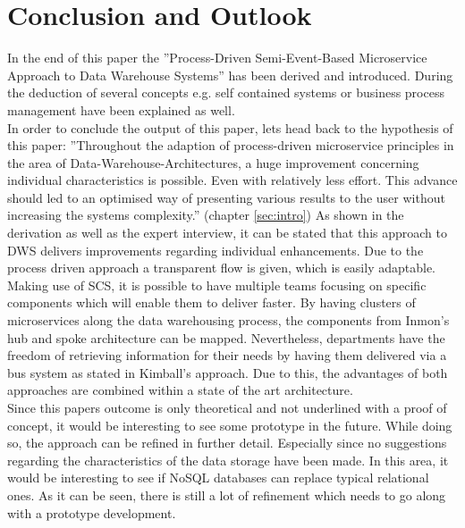 \section{Conclusion and Outlook}
\label{sec:conclusion}
In the end of this paper the ''Process-Driven Semi-Event-Based Microservice Approach to Data Warehouse Systems'' has been derived and introduced. During the deduction of several concepts e.g. self contained systems or business process management have been explained as well. \newline
\\
In order to conclude the output of this paper, lets head back to the hypothesis of this paper: ''Throughout the adaption of process-driven  microservice  principles  in  the  area  of  Data-Warehouse-Architectures,  a  huge improvement concerning individual characteristics is possible. Even with relatively less effort. This advance should led to an optimised way of presenting various results to the user without increasing the systems complexity.'' (chapter \ref{sec:intro})
As shown in the derivation as well as the expert interview, it can be stated that this approach to DWS delivers improvements regarding individual enhancements. Due to the process driven approach a transparent flow is given, which is easily adaptable. Making use of SCS, it is possible to have multiple teams focusing on specific components which will enable them to deliver faster. By having clusters of microservices along the data warehousing process, the components from Inmon's hub and spoke architecture can be mapped. Nevertheless, departments have the freedom of retrieving information for their needs by having them delivered via a bus system as stated in Kimball's approach.\newline
Due to this, the advantages of both approaches are combined within a state of the art architecture. \newline
\\
Since this papers outcome is only theoretical and not underlined with a proof of concept, it would be interesting to see some prototype in the future. While doing so, the approach can be refined in further detail. Especially since no suggestions regarding the characteristics of the data storage have been made. In this area, it would be interesting to see if NoSQL databases can replace typical relational ones. As it can be seen, there is still a lot of refinement which needs to go along with a prototype development.

